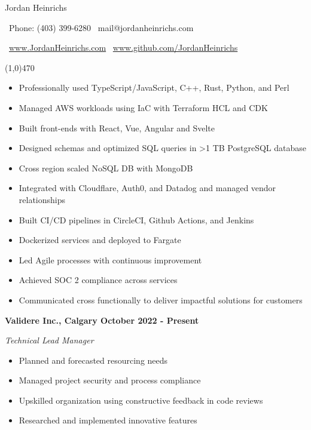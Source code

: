 \documentclass[12pt]{article}
\begin{document}
\centerline{{\Huge \sc Jordan Heinrichs}}
\medskip
\centerline{\textbullet\ Phone: (403) 399-6280 \hspace{5pt} \textbullet\ mail@jordanheinrichs.com}
\centerline{\textbullet\ \url{www.JordanHeinrichs.com}  \hspace{5pt} \textbullet\ \url{www.github.com/JordanHeinrichs}}
\noindent
\line(1,0){470}\\

\bigskip
{}
\medskip

\begin{itemize}
\item Professionally used TypeScript/JavaScript, C++, Rust, Python, and Perl
\item Managed AWS workloads using IaC with Terraform HCL and CDK
\item Built front-ends with React, Vue, Angular and Svelte
\item Designed schemas and optimized SQL queries in \textgreater 1 TB PostgreSQL database
\item Cross region scaled NoSQL DB with MongoDB
\item Integrated with Cloudflare, Auth0, and Datadog and managed vendor relationships
\item Built CI/CD pipelines in CircleCI, Github Actions, and Jenkins
\item Dockerized services and deployed to Fargate
\item Led Agile processes with continuous improvement
\item Achieved SOC 2 compliance across services
\item Communicated cross functionally to deliver impactful solutions for customers
\end{itemize}
\noindent

\bigskip
{}
\bigskip

\noindent \centerline{ \bf Validere Inc., Calgary \hfill October 2022 - Present}
\indent \emph{ Technical Lead Manager }
\begin{itemize}
  \item Planned and forecasted resourcing needs
  \item Managed project security and process compliance
  \item Upskilled organization using constructive feedback in code reviews
  \item Researched and implemented innovative features
\end{itemize}
\end{document}
